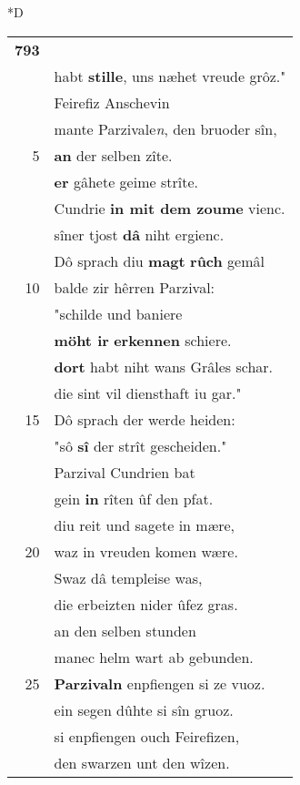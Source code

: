 \documentclass[8pt,a4paper,notitlepage]{article}
\begin{document}
\begin{table}[ht]
\begin{minipage}[t]{0.5\linewidth}
\small
\begin{center}*D
\end{center}
\begin{tabular}{rl}
\textbf{793} & \textit{\begin{large}S\end{large}}ît uns der jâmerstric beslôz.\\ 
 & habt \textbf{stille}, uns næhet vreude grôz."\\ 
 & Feirefiz Anschevin\\ 
 & mante Parzivale\textit{n}, den bruoder sîn,\\ 
5 & \textbf{an} der selben zîte.\\ 
 & \textbf{er} gâhete geime strîte.\\ 
 & Cundrie \textbf{in mit dem zoume} vienc.\\ 
 & sîner tjost \textbf{dâ} niht ergienc.\\ 
 & Dô sprach diu \textbf{magt} \textbf{rûch} gemâl\\ 
10 & balde zir hêrren Parzival:\\ 
 & "schilde und baniere\\ 
 & \textbf{möht ir} \textbf{erkennen} schiere.\\ 
 & \textbf{dort} habt niht wans Grâles schar.\\ 
 & die sint vil diensthaft iu gar."\\ 
15 & Dô sprach der werde heiden:\\ 
 & "sô \textbf{sî} der strît gescheiden."\\ 
 & Parzival Cundrien bat\\ 
 & gein \textbf{in} rîten ûf den pfat.\\ 
 & diu reit und sagete in mære,\\ 
20 & waz in vreuden komen wære.\\ 
 & Swaz dâ templeise was,\\ 
 & die erbeizten nider ûfez gras.\\ 
 & an den selben stunden\\ 
 & manec helm wart ab gebunden.\\ 
25 & \textbf{Parzivaln} enpfiengen si ze vuoz.\\ 
 & ein segen dûhte si sîn gruoz.\\ 
 & si enpfiengen ouch Feirefizen,\\ 
 & den swarzen unt den wîzen.\\ 

\end{tabular}
\end{minipage}
\end{table}
\end{document}
